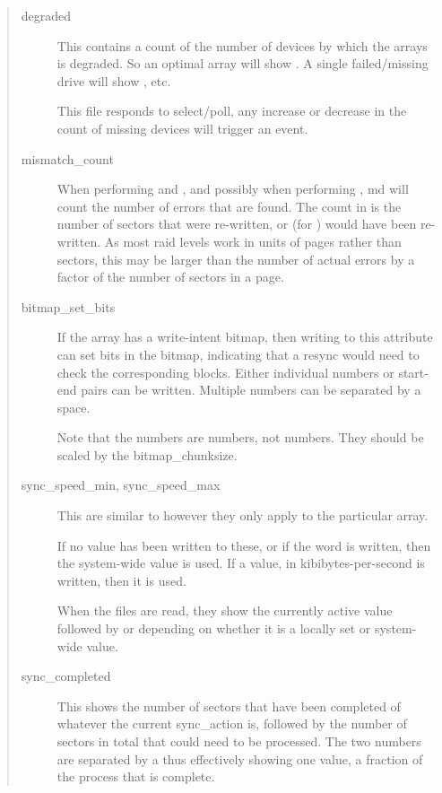 \documentclass[a4paper,8pt,english]{sphinxmanual}
\begin{document}
\begin{quote}
\begin{description}
\item[{degraded}] \leavevmode
This contains a count of the number of devices by which the
arrays is degraded.  So an optimal array will show .  A
single failed/missing drive will show , etc.

This file responds to select/poll, any increase or decrease
in the count of missing devices will trigger an event.

\item[{mismatch\_count}] \leavevmode
When performing  and , and possibly when
performing , md will count the number of errors that are
found.  The count in  is the number of sectors
that were re-written, or (for ) would have been
re-written.  As most raid levels work in units of pages rather
than sectors, this may be larger than the number of actual errors
by a factor of the number of sectors in a page.

\item[{bitmap\_set\_bits}] \leavevmode
If the array has a write-intent bitmap, then writing to this
attribute can set bits in the bitmap, indicating that a resync
would need to check the corresponding blocks. Either individual
numbers or start-end pairs can be written.  Multiple numbers
can be separated by a space.

Note that the numbers are  numbers, not  numbers.
They should be scaled by the bitmap\_chunksize.

\item[{sync\_speed\_min, sync\_speed\_max}] \leavevmode
This are similar to 
however they only apply to the particular array.

If no value has been written to these, or if the word 
is written, then the system-wide value is used.  If a value,
in kibibytes-per-second is written, then it is used.

When the files are read, they show the currently active value
followed by  or  depending on whether it is
a locally set or system-wide value.

\item[{sync\_completed}] \leavevmode
This shows the number of sectors that have been completed of
whatever the current sync\_action is, followed by the number of
sectors in total that could need to be processed.  The two
numbers are separated by a \code{/}  thus effectively showing one
value, a fraction of the process that is complete.


\end{description}
\end{quote}
\end{document}

